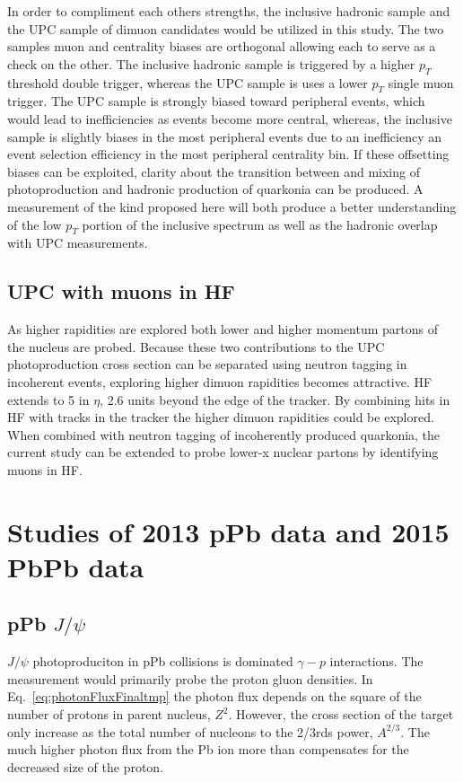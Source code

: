       In order to compliment each others strengths, the inclusive hadronic sample 
        and the UPC sample of dimuon candidates would be utilized in this study.
      The two samples muon and centrality biases are orthogonal allowing each to 
        serve as a check on the other. 
      The inclusive hadronic sample is triggered by a higher $p_{T}$ threshold 
        double trigger, whereas the UPC sample is uses a lower $p_{T}$ single 
        muon trigger.
      The UPC sample is strongly biased toward peripheral events, which would 
        lead to inefficiencies as events become more central, whereas, the 
        inclusive sample is slightly biases in the most peripheral events due to
        an inefficiency an event selection efficiency in the most peripheral 
        centrality bin.
      If these offsetting biases can be exploited, clarity about the transition 
        between and mixing of photoproduction and hadronic production of 
        quarkonia can be produced. 
      A measurement of the kind proposed here will both produce a better 
        understanding of the low $p_{T}$ portion of the inclusive spectrum as 
        well as the hadronic overlap with UPC measurements.

    \subsection{UPC with muons in HF}
      As higher rapidities are explored both lower and higher momentum partons
        of the nucleus are probed. 
      Because these two contributions to the UPC photoproduction cross section 
        can be separated using neutron tagging in incoherent events, exploring
        higher dimuon rapidities becomes attractive.
      HF extends to 5 in $\eta$, 2.6 units beyond the edge of the tracker.
      By combining hits in HF with tracks in the tracker the higher dimuon 
        rapidities could be explored. 
      When combined with neutron tagging of incoherently produced quarkonia,
        the current study can be extended to probe lower-x nuclear partons 
        by identifying muons in HF. 

  \section{Studies of 2013 pPb data and 2015 PbPb data}
 
    \subsection{pPb $J/\psi$}
      $J/\psi$ photoproduciton in pPb collisions is dominated $\gamma-p$ 
        interactions.
      The measurement would primarily probe the proton gluon densities.
      In Eq.~\ref{eq:photonFluxFinaltmp} the photon flux depends on the square
      of the number of protons in parent nucleus, $Z^{2}$. 
      However, the cross section of the target only increase as the total 
        number of nucleons to the 2/3rds power, $A^{2/3}$.
      The much higher photon flux from the Pb ion more than compensates for 
        the decreased size of the proton.

